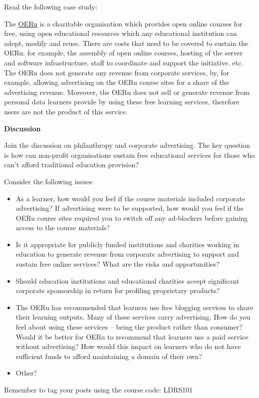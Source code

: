 \documentclass[
]{book}
\providecommand{\tightlist}{%
  \setlength{\itemsep}{0pt}\setlength{\parskip}{0pt}}
\theoremstyle{definition}
\theoremstyle{definition}
\theoremstyle{definition}
\theoremstyle{definition}
\theoremstyle{remark}
\begin{document}
\begin{reflect}
Read the following case study:

The \href{https://oeru.org/}{OERu} is a charitable organisation which provides open online courses for free, using open educational resources which any educational institution can adopt, modify and reuse. There are costs that need to be covered to sustain the OERu: for example, the assembly of open online courses, hosting of the server and software infrastructure, staff to coordinate and support the initiative. etc. The OERu does not generate any revenue from corporate services, by, for example, allowing advertising on the OERu course sites for a share of the advertising revenue. Moreover, the OERu does not sell or generate revenue from personal data learners provide by using these free learning services, therefore users are not the product of this service.

\textbf{Discussion}

Join the discussion on philanthropy and corporate advertising. The key question is how can non-profit organisations sustain free educational services for those who can't afford traditional education provision?

Consider the following issues:

\begin{itemize}
\tightlist
\item
  As a learner, how would you feel if the course materials included corporate advertising? If advertising were to be supported, how would you feel if the OERu course sites required you to switch off any ad-blockers before gaining access to the course materials?\\
\item
  Is it appropriate for publicly funded institutions and charities working in education to generate revenue from corporate advertising to support and sustain free online services? What are the risks and opportunities?\\
\item
  Should education institutions and educational charities accept significant corporate sponsorship in return for profiling proprietary products?\\
\item
  The OERu has recommended that learners use free blogging services to share their learning outputs. Many of these services carry advertising. How do you feel about using these services -- being the product rather than consumer? Would it be better for OERu to recommend that learners use a paid service without advertising? How would this impact on learners who do not have sufficient funds to afford maintaining a domain of their own?\\
\item
  Other?
\end{itemize}

Remember to tag your posts using the course code: LDRS101
\end{reflect}
\end{document}
